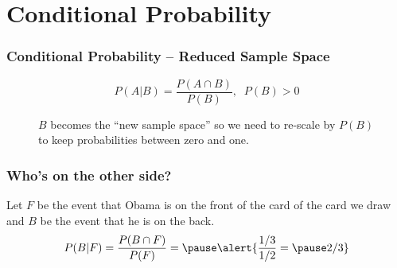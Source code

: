 \documentclass{beamer}
\begin{document}
\section{Conditional Probability}
\begin{frame}
\frametitle{Conditional Probability -- Reduced Sample Space}
$$
P(A|B) = \frac{P(A\cap B)}{P(B)},\;\; P(B)>0
$$
\begin{figure}
\centering
{}
\caption{$B$ becomes the ``new sample space'' so we need to re-scale by $P(B)$ to keep probabilities between zero and one.}
\end{figure}
\end{frame}
\begin{frame}
\frametitle{Who's on the other side?}
Let $F$ be the event that Obama is on the front of the card of the card we draw and $B$ be the event that he is on the back.
$$P(B|F) = \frac{P(B\cap F)}{P(F)} = \pause \alert{\frac{1/3}{1/2}= \pause 2/3}$$

\end{frame}
\end{document}
